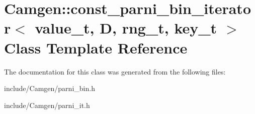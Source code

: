 \hypertarget{a00097}{}\section{Camgen\+:\+:const\+\_\+parni\+\_\+bin\+\_\+iterator$<$ value\+\_\+t, D, rng\+\_\+t, key\+\_\+t $>$ Class Template Reference}
\label{a00097}


The documentation for this class was generated from the following files\+:\begin{DoxyCompactItemize}
\item 
include/\+Camgen/parni\+\_\+bin.\+h\item 
include/\+Camgen/parni\+\_\+it.\+h\end{DoxyCompactItemize}
